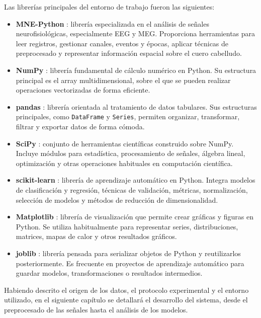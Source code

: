 Las librerías principales del entorno de trabajo fueron las siguientes:

\begin{itemize}
    \item \textbf{MNE-Python} \cite{mnePythonDocs}: librería especializada en el análisis de señales neurofisiológicas, especialmente \ac{EEG} y \ac{MEG}. Proporciona herramientas para leer registros, gestionar canales, eventos y épocas, aplicar técnicas de preprocesado y representar información espacial sobre el cuero cabelludo.
    \item \textbf{NumPy} \cite{numpyDocs}: librería fundamental de cálculo numérico en Python. Su estructura principal es el array multidimensional, sobre el que se pueden realizar operaciones vectorizadas de forma eficiente.
    \item \textbf{pandas} \cite{pandasDocs}: librería orientada al tratamiento de datos tabulares. Sus estructuras principales, como \texttt{DataFrame} y \texttt{Series}, permiten organizar, transformar, filtrar y exportar datos de forma cómoda.
    \item \textbf{SciPy} \cite{scipyDocs}: conjunto de herramientas científicas construido sobre NumPy. Incluye módulos para estadística, procesamiento de señales, álgebra lineal, optimización y otras operaciones habituales en computación científica.
    \item \textbf{scikit-learn} \cite{sklearnDocs}: librería de aprendizaje automático en Python. Integra modelos de clasificación y regresión, técnicas de validación, métricas, normalización, selección de modelos y métodos de reducción de dimensionalidad.
    \item \textbf{Matplotlib} \cite{matplotlibDocs}: librería de visualización que permite crear gráficas y figuras en Python. Se utiliza habitualmente para representar series, distribuciones, matrices, mapas de calor y otros resultados gráficos.
    \item \textbf{joblib} \cite{joblibDocs}: librería pensada para serializar objetos de Python y reutilizarlos posteriormente. Es frecuente en proyectos de aprendizaje automático para guardar modelos, transformaciones o resultados intermedios.
\end{itemize}

Habiendo descrito el origen de los datos, el protocolo experimental y el entorno utilizado, en el siguiente capítulo se detallará el desarrollo del sistema, desde el preprocesado de las señales hasta el análisis de los modelos.
